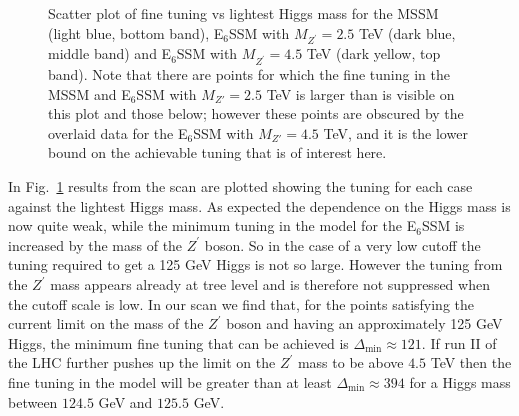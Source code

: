 \documentclass[preprint,amsmath,amssymb,aps,superscriptaddress,prd,
showpacs,floatfix,nofootinbib]{revtex4-1}
\begin{document}
\begin{figure}[h]
\begin{center}
\caption{Scatter plot of fine tuning vs lightest Higgs mass for the
MSSM (light blue, bottom band), E$_6$SSM with $M_{Z^\prime} = 2.5$ TeV
(dark blue, middle band) and E$_6$SSM with $M_{Z^\prime} = 4.5$ TeV
(dark yellow, top band).  Note that there are points for which
the fine tuning in the MSSM and E$_6$SSM with $M_{Z'} = 2.5$ TeV is larger
than is visible on this plot and those below; however these points are
obscured by the overlaid data for the E$_6$SSM with $M_{Z'} = 4.5$ TeV, and
it is the lower bound on the achievable tuning that is of interest here.}
\label{Fig:e6ssmvsmssm}
\end{center}
\end{figure}

In Fig.~\ref{Fig:e6ssmvsmssm} results from the scan are plotted showing
the tuning for each case against the lightest Higgs mass.  As expected
the dependence on the Higgs mass is now quite weak, while the minimum
tuning in the model for the E$_6$SSM is increased by the mass of the
$Z^\prime$ boson.  So in the case of a very low cutoff the tuning
required to get a 125 GeV Higgs is not so large.  However the tuning
from the $Z^\prime$ mass appears already at tree level and is
therefore not suppressed when the cutoff scale is low.  In our scan we
find that, for the points satisfying the current limit on the mass of
the $Z^\prime$ boson and having an approximately 125 GeV Higgs, the
minimum fine tuning that can be achieved is
$\Delta_{\textrm{min}} \approx 121$.  If run II of the LHC further
pushes up the limit on the $Z^\prime$ mass to be above $4.5$ TeV then
the fine tuning in the model will be greater than at least
$\Delta_{\textrm{min}} \approx 394$ for a Higgs mass between $124.5$
GeV and $125.5$ GeV.
\end{document}
